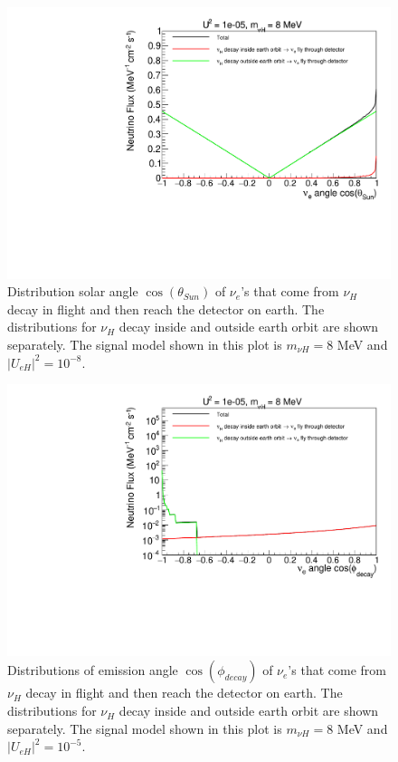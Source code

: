 \documentclass[%
 reprint,
 amsmath,amssymb,
 aps,
 prd,
floatfix,
twocolumn,
]{revtex4-1}
\begin{document}
\begin{figure}[!htbp]
\includegraphics[width=0.99\columnwidth]{../plots/DecayInFlightNuLCosthetaSun_U1e-05_M8.0_InsideOutside_linXlinY.pdf}
\caption{Distribution solar angle $\cos(\theta_{Sun})$ of $\nu_e$'s that come from $\nu_H$ decay in flight and then reach the detector on earth. The distributions for $\nu_H$ decay inside and outside earth orbit are shown separately. The signal model shown in this plot is $m_{\nu H} = 8$ MeV and $|U_{eH}|^2 = 10^{-8}$.}
\label{fig:DecayInFlightTheta_U1em5_M8} 
\end{figure}


\begin{figure}[!htbp]
\includegraphics[width=0.99\columnwidth]{../plots/DecayInFlightNuLCosphiSun_U1e-05_M8.0_InsideOutside_linXlogY.pdf}
\caption{Distributions of emission angle $\cos(\phi_{decay})$ of $\nu_e$'s that come from $\nu_H$ decay in flight and then reach the detector on earth. The distributions for $\nu_H$ decay inside and outside earth orbit are shown separately. The signal model shown in this plot is $m_{\nu H} = 8$ MeV and $|U_{eH}|^2 = 10^{-5}$.}
\label{fig:DecayInFlightPhi_U1em5_M8} 
\end{figure}
\end{document}
